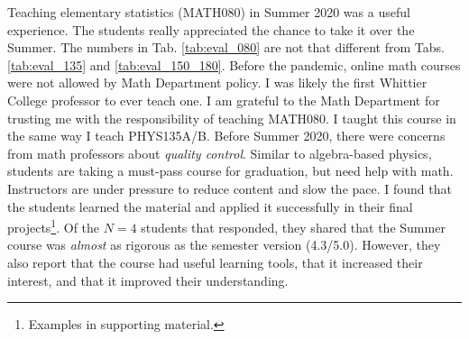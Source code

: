 \documentclass[../../main.tex]{subfiles}
\begin{document}
Teaching elementary statistics (MATH080) in Summer 2020 was a useful experience.  The students really appreciated the chance to take it over the Summer.  The numbers in Tab. \ref{tab:eval_080} are not that different from Tabs. \ref{tab:eval_135} and \ref{tab:eval_150_180}.  Before the pandemic, online math courses were not allowed by Math Department policy.  I was likely the first Whittier College professor to ever teach one.  I am grateful to the Math Department for trusting me with the responsibility of teaching MATH080.  I taught this course in the same way I teach PHYS135A/B.  Before Summer 2020, there were concerns from math professors about \textit{quality control}.  Similar to algebra-based physics, students are taking a must-pass course for graduation, but need help with math.  Instructors are under pressure to reduce content and slow the pace.  I found that the students learned the material and applied it successfully in their final projects\footnote{Examples in supporting material.}.  Of the $N = 4$ students that responded, they shared that the Summer course was \textit{almost} as rigorous as the semester version (4.3/5.0).  However, they also report that the course had useful learning tools, that it increased their interest, and that it improved their understanding.
\end{document}
